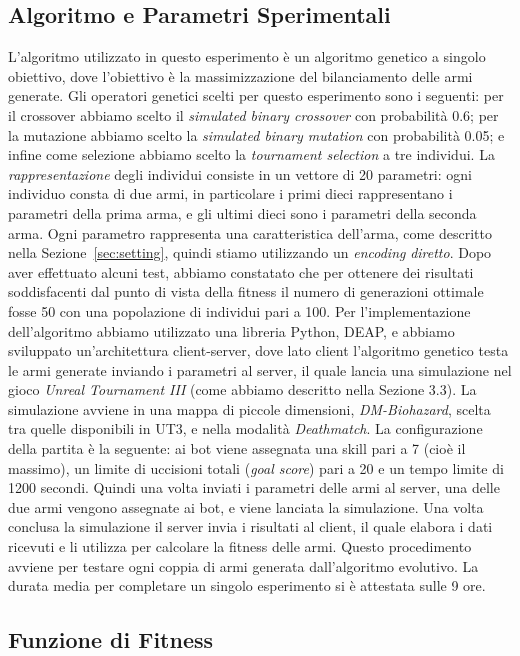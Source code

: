 \documentclass[12pt, italian]{toptesi}
\begin{document}
\subsection{Algoritmo e Parametri Sperimentali}
L'algoritmo utilizzato in questo esperimento è un algoritmo genetico a singolo obiettivo, dove l'obiettivo è la massimizzazione del bilanciamento delle armi generate.
Gli operatori genetici scelti per questo esperimento sono i seguenti:  per il crossover abbiamo scelto il \emph{simulated binary crossover} con probabilità 0.6; per la mutazione abbiamo scelto la \emph{simulated binary mutation} con probabilità 0.05; e infine come selezione abbiamo scelto la \emph{tournament selection} a tre individui.
La \emph{rappresentazione} degli individui consiste in un vettore di 20 parametri: ogni individuo consta di due armi, in particolare i primi dieci rappresentano i parametri della prima arma, e gli ultimi dieci sono i parametri della seconda arma.
Ogni parametro rappresenta una caratteristica dell'arma, come descritto nella Sezione~\ref{sec:setting}, quindi stiamo utilizzando un \emph{encoding} \emph{diretto}.
Dopo aver effettuato alcuni test, abbiamo constatato che per ottenere dei risultati soddisfacenti dal punto di vista della fitness il numero di generazioni ottimale fosse 50 con una popolazione di individui pari a 100.
Per l'implementazione dell'algoritmo abbiamo utilizzato una libreria {P}ython,  DEAP\cite{deap:article}, e abbiamo sviluppato un'architettura client-server, dove lato client l'algoritmo genetico testa le armi generate inviando i parametri al server, il quale lancia una simulazione nel gioco \emph{Unreal Tournament III} (come abbiamo descritto nella Sezione 3.3). 
La simulazione avviene in una mappa di piccole dimensioni, \emph{DM-Biohazard}, scelta tra quelle disponibili in UT3, e nella modalità \emph{Deathmatch}. La configurazione della partita è la seguente: ai bot viene assegnata una skill pari a 7 (cioè il massimo), un limite di uccisioni totali (\emph{goal score}) pari a 20 e un tempo limite di 1200 secondi.
Quindi una volta inviati i parametri delle armi al server, una delle due armi vengono assegnate ai bot, e viene lanciata la simulazione.
Una volta conclusa la simulazione il server invia i risultati al client, il quale elabora i dati ricevuti e li utilizza per calcolare la fitness delle armi.
Questo procedimento avviene per testare ogni coppia di armi generata dall'algoritmo evolutivo.
La durata media per completare un singolo esperimento si è attestata sulle 9 ore.

\subsection{Funzione di Fitness}
\label{subsec:fitness}
\end{document}
